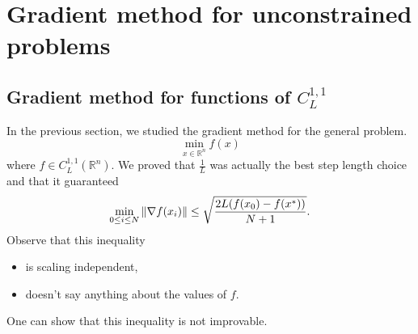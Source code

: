 %
%
%

%
%
%
%
%





\section{Gradient method for unconstrained problems}

\subsection{Gradient method for functions of $C_L^{1,1}$}

In the previous section, we studied the gradient method for the general problem.
\begin{equation*}
\min_{x \in \mathbb{R}^n} f(x)
\end{equation*}
where $f \in C_L^{1,1}(\mathbb{R}^n)$. We proved that $\frac{1}{L}$ was actually the best step length choice and that it guaranteed
\begin{equation}
\min_{0 \le i \le N} \left\Vert \nabla f(x_i) \right\Vert \le \sqrt{\frac{2L(f(x_0)-f(x^*))}{N+1}} .
\label{MinGrad}
\end{equation}
Observe that this inequality
\begin{itemize}
\item is scaling independent,
\item doesn't say anything about the values of $f$.
\end{itemize}
One can show that this inequality is not improvable. \\

